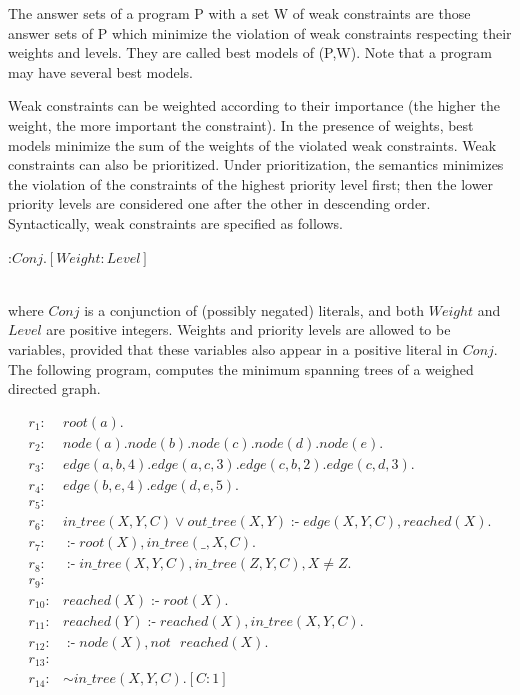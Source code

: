 \documentclass[14pt,a4paper, titlepage]{article}
\DeclareMathOperator{\leftimpl}{:-}
\begin{document}
The answer sets of a program P with a set W of weak constraints are those answer sets of P which minimize the violation of weak constraints respecting their weights and levels. They are called best models of (P,W). Note that a program may have several best models.


Weak constraints can be weighted according to their importance (the higher the weight, the more important the constraint). In the presence of weights, best models minimize the sum of the weights of the violated weak constraints. Weak constraints can also be prioritized. Under prioritization, the semantics minimizes the violation of the constraints of the highest priority level first; then the lower priority levels are considered one after the other in descending order. Syntactically, weak constraints are specified as follows. \\ \centerline{:$\mathit{Conj}. [\mathit{Weight}:\mathit{Level}]$} \\ where $\mathit{Conj}$ is a conjunction of (possibly negated) literals, and both $\mathit{Weight}$ and $\mathit{Level}$ are positive integers. Weights and priority levels are allowed to be variables, provided that these variables also appear in a positive literal in $\mathit{Conj}$.
The following program, computes the minimum spanning trees of a weighed directed graph.
\begin{exmp}
\begin{align*}
r_1\colon& \mathit{root}(a). \\
r_2\colon& \mathit{node}(a). \mathit{node}(b). \mathit{node}(c). \mathit{node}(d). \mathit{node}(e). \\
r_3\colon& \mathit{edge}(a,b,4). \mathit{edge}(a,c,3). \mathit{edge}(c,b,2). \mathit{edge}(c,d,3). \\
r_4\colon& \mathit{edge}(b,e,4). \mathit{edge}(d,e,5). \\
r_5\colon& \\
r_6 \colon & \mathit{in\_tree}(X,Y,C) \vee \mathit{out\_tree}(X,Y) \leftimpl \mathit{edge}(X,Y,C), \mathit{reached}(X). \\
r_7\colon& \leftimpl \mathit{root}(X), \mathit{in\_tree}(\_,X,C).\\
r_8\colon& \leftimpl \mathit{in\_tree}(X,Y,C), \mathit{in\_tree}(Z,Y,C), X \neq Z. \\
r_9\colon&  \\
r_{10}\colon& \mathit{reached}(X) \leftimpl \mathit{root}(X). \\
r_{11}\colon& \mathit{reached}(Y) \leftimpl \mathit{reached}(X), \mathit{in\_tree}(X,Y,C). \\
r_{12}\colon& \leftimpl \mathit{node}(X), \mathit{not} \text{ } \mathit{reached}(X). \\
r_{13}\colon&   \\
r_{14}\colon&\mathit{ \sim in\_tree}(X,Y,C). [C:1]
\end{align*}
\end{exmp}
\end{document}
